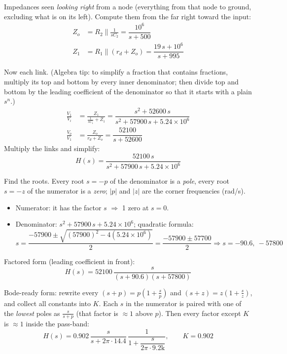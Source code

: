 \documentclass[11pt]{article}
\newcommand{\solstep}[2]{\par\medskip{\color{stepc}\textbf{Step #1 --- #2}}\par\nopagebreak}
\begin{document}
Impedances seen \emph{looking right} from a node (everything from that node to ground, excluding what is on its left). Compute them from the far right toward the input:
\begin{align*}
Z_{o} &= R_{2} \parallel \frac{1}{sC_{2}} = \dfrac{10^{6}}{s + 500} \\
Z_{1} &= R_{1} \parallel \left(r_d + Z_{o}\right) = \dfrac{19\,s + 10^{6}}{s + 995}
\end{align*}

Now each link. {\small (Algebra tip: to simplify a fraction that contains fractions, multiply its top and bottom by every inner denominator; then divide top and bottom by the leading coefficient of the denominator so that it starts with a plain $s^n$.)}
\begin{align*}
\frac{V_{1}}{V_{i}} &= \frac{Z_{1}}{\frac{1}{sC_{1}} + Z_{1}} = \dfrac{s^{2} + 52600\,s}{s^{2} + 57900\,s + 5.24\times 10^{6}} \\
\frac{V_{o}}{V_{1}} &= \frac{Z_{o}}{r_d + Z_{o}} = \dfrac{52100}{s + 52600}
\end{align*}
Multiply the links and simplify:\[
H(s) = \dfrac{52100\,s}{s^{2} + 57900\,s + 5.24\times 10^{6}}
\]

\solstep{5}{Standard (Bode-ready) form}Find the roots. Every root $s=-p$ of the denominator is a \emph{pole}, every root $s=-z$ of the numerator is a \emph{zero}; $|p|$ and $|z|$ are the corner frequencies (rad/s).
\begin{itemize}[leftmargin=*,itemsep=2pt]
\item Numerator: it has the factor $s$ $\Rightarrow$ 1 zero at $s=0$.
\item Denominator: $s^{2} + 57900\,s + 5.24\times 10^{6}$; quadratic formula:\[
s = \frac{-57900 \pm \sqrt{(57900)^2 - 4(5.24\times 10^{6})}}{2} = \frac{-57900 \pm 57700}{2} \Rightarrow s = -90.6,\ -57800
\]

\end{itemize}

Factored form (leading coefficient in front):
\[
H(s) = 52100\,\dfrac{s}{(s+90.6)(s+57800)}
\]

Bode-ready form: rewrite every $(s+p) = p\left(1+\frac{s}{p}\right)$ and $(s+z) = z\left(1+\frac{s}{z}\right)$, and collect all constants into $K$. Each $s$ in the numerator is paired with one of the \emph{lowest} poles as $\frac{s}{s+p}$ (that factor is $\approx 1$ above $p$). Then every factor except $K$ is $\approx 1$ inside the pass-band:
\[
H(s) = 0.902\,\dfrac{s}{s+2\pi\cdot 14.4}\,\dfrac{1}{1+\dfrac{s}{2\pi\cdot 9.2\mathrm{k}}},\qquad K = 0.902
\]
\end{document}
